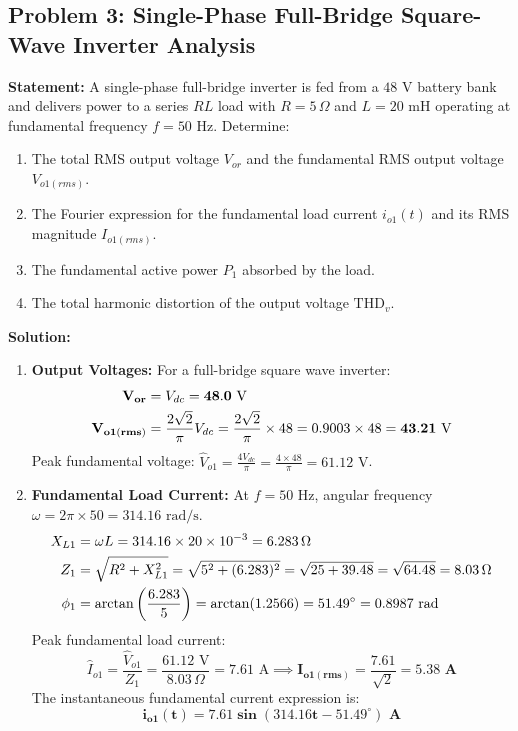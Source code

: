 \documentclass[11pt,a4paper]{article}
\begin{document}
\subsection{Problem 3: Single-Phase Full-Bridge Square-Wave Inverter Analysis}
\begin{examplebox}
\textbf{Statement:} A single-phase full-bridge inverter is fed from a $48\text{ V}$ battery bank and delivers power to a series $RL$ load with $R = 5\,\Omega$ and $L = 20\text{ mH}$ operating at fundamental frequency $f = 50\text{ Hz}$. Determine:
\begin{enumerate}
  \item The total RMS output voltage $V_{or}$ and the fundamental RMS output voltage $V_{o1(rms)}$.
  \item The Fourier expression for the fundamental load current $i_{o1}(t)$ and its RMS magnitude $I_{o1(rms)}$.
  \item The fundamental active power $P_1$ absorbed by the load.
  \item The total harmonic distortion of the output voltage $\text{THD}_v$.
\end{enumerate}

\tcblower
\textbf{Solution:}
\begin{enumerate}
  \item \textbf{Output Voltages:}
  For a full-bridge square wave inverter:
  \begin{align*}
  \mathbf{V_{or}} &= V_{dc} = \mathbf{48.0\text{ V}} \notag\\
  \mathbf{V_{o1(rms)}} &= \frac{2\sqrt{2}}{\pi} V_{dc} = \frac{2\sqrt{2}}{\pi} \times 48 = 0.9003 \times 48 = \mathbf{43.21\text{ V}}
  \end{align*}
  Peak fundamental voltage: $\hat{V}_{o1} = \frac{4V_{dc}}{\pi} = \frac{4 \times 48}{\pi} = 61.12\text{ V}$.

  \item \textbf{Fundamental Load Current:}
  At $f = 50\text{ Hz}$, angular frequency $\omega = 2\pi \times 50 = 314.16\text{ rad/s}$.
  \begin{align*}
  X_{L1} &= \omega L = 314.16 \times 20 \times 10^{-3} = 6.283\,\Omega \notag\\
  Z_1 &= \sqrt{R^2 + X_{L1}^2} = \sqrt{5^2 + (6.283)^2} = \sqrt{25 + 39.48} = \sqrt{64.48} = 8.03\,\Omega \notag\\
  \phi_1 &= \arctan\left(\frac{6.283}{5}\right) = \arctan(1.2566) = 51.49^\circ = 0.8987\text{ rad}
  \end{align*}
  Peak fundamental load current:
  \begin{equation*}
  \hat{I}_{o1} = \frac{\hat{V}_{o1}}{Z_1} = \frac{61.12\text{ V}}{8.03\,\Omega} = 7.61\text{ A} \implies \mathbf{I_{o1(rms)}} = \frac{7.61}{\sqrt{2}} = \mathbf{5.38\text{ A}}
  \end{equation*}
  The instantaneous fundamental current expression is:
  \begin{equation*}
  \mathbf{i_{o1}(t) = 7.61 \sin(314.16 t - 51.49^\circ)\text{ A}}
  \end{equation*}


\end{enumerate}
\end{examplebox}
\end{document}
